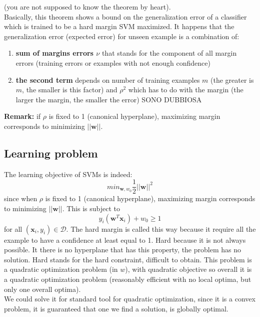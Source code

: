     (you are not supposed to know the theorem by heart).\\
    Basically, this theorem shows a bound on the generalization error of a classifier which is trained to be a hard margin SVM maximized. It happens that the generalization error (expected error) for unseen example is a combination of:
    \begin{enumerate}
        \item \textbf{sum of margins errors $\nu$} that stands for the component of all margin errors (training errors or examples with not enough confidence)
        \item \textbf{the second term} depends on number of training examples $m$ (the greater is $m$, the smaller is this factor) and $\rho^2$ which has to do with the margin (the larger the margin, the smaller the error) SONO DUBBIOSA
    \end{enumerate}
    
    \textbf{Remark:} if $\rho$ is fixed to 1 (canonical hyperplane), maximizing margin corresponds to minimizing $||\pmb{w}||$.

    \subsection{Learning problem}
        The learning objective of SVMs is indeed: 
        \begin{equation}
            min_{\pmb{w}, w_0} \frac{1}{2} ||\pmb{w}||^2
        \end{equation}
        since when $\rho$ is fixed to 1 (canonical hyperplane), maximizing margin corresponds to minimizing $||\pmb{w}||$.
        This is subject to 
        $$y_i (\pmb{w}^T \pmb{x}_i) + w_0 \geq 1$$ 
        for all $(\pmb{x}_i, y_i) \in \mathcal{D}$. The hard margin is called this way because it require all the example to have a confidence at least equal to 1. Hard because it is not always possible. 
        It there is no hyperplane that has this property, the problem has no solution. Hard stands for the hard constraint, difficult to obtain. 
        This problem is a quadratic optimization problem (in $w$), with quadratic objective so overall it is a quadratic optimization problem (reasonably efficient with no local optima, but only one overall optima).\\
        We could solve it for standard tool for quadratic optimization, since it is a convex problem, it is guaranteed that one we find a solution, is globally optimal. 
        
